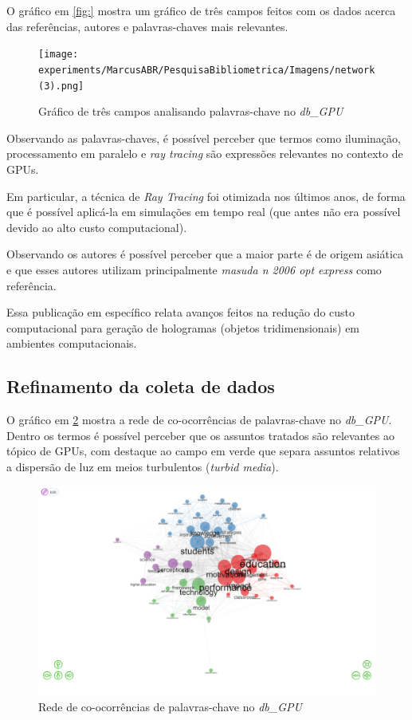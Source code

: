 O gráfico em \ref{fig:} mostra um gráfico de três campos feitos com os dados acerca das referências, autores e palavras-chaves mais relevantes.

\begin{figure}[ht]
    \centering
    \texttt{[image: experiments/MarcusABR/PesquisaBibliometrica/Imagens/network(3).png]}
    \caption{Gráfico de três campos analisando palavras-chave no \textit{db\_GPU}}
    \label{fig:gpu-three-field}
\end{figure}

Observando as palavras-chaves, é possível perceber que termos como iluminação, processamento em paralelo e \textit{ray tracing} são expressões relevantes no contexto de GPUs.

Em particular, a técnica de \textit{Ray Tracing} foi otimizada nos últimos anos, de forma que é possível aplicá-la em simulações em tempo real (que antes não era possível devido ao alto custo computacional).

Observando os autores é possível perceber que a maior parte é de origem asiática e que esses autores utilizam principalmente \textit{masuda n 2006 opt express} como referência.

Essa publicação em específico relata avanços feitos na redução do custo computacional para geração de hologramas (objetos tridimensionais) em ambientes computacionais.

\subsection{Refinamento da coleta de dados}

O gráfico em \ref{fig:gpu-co-occur} mostra a rede de co-ocorrências de palavras-chave no \textit{db\_GPU}. Dentro os termos é possível perceber que os assuntos tratados são relevantes ao tópico de GPUs, com destaque ao campo em verde que separa assuntos relativos a dispersão de luz em meios turbulentos (\textit{turbid media}).

\begin{figure}[ht]
    \includegraphics[width=12cm]{experiments/MarcusABR/PesquisaBibliometrica/Imagens/network.png}
    \caption{Rede de co-ocorrências de palavras-chave no \textit{db\_GPU}}
    \label{fig:gpu-co-occur}
\end{figure}

